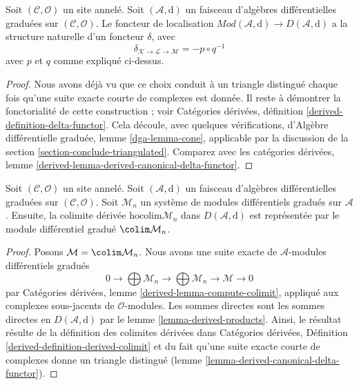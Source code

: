 \begin{lemma}
\label{lemma-derived-canonical-delta-functor}
Soit $(\mathcal{C}, \mathcal{O})$ un site annelé.
Soit $(\mathcal{A}, \text{d})$ un faisceau d'algèbres différentielles graduées sur $(\mathcal{C}, \mathcal{O})$.
Le foncteur de localisation $\textit{Mod}(\mathcal{A}, \text{d}) \to D(\mathcal{A}, \text{d})$ a la structure naturelle d'un foncteur $\delta$, avec
$$
\delta_{\mathcal{K} \to \mathcal{L} \to \mathcal{M}} = - p \circ q^{-1}
$$
avec $p$ et $q$ comme expliqué ci-dessus.
\end{lemma}

\begin{proof}
Nous avons déjà vu que ce choix conduit à un triangle distingué chaque fois qu'une suite exacte courte de complexes est donnée.
Il reste à démontrer la fonctorialité de cette construction ; voir Catégories dérivées, définition \ref{derived-definition-delta-functor}.
Cela découle, avec quelques vérifications, d'Algèbre différentielle graduée, lemme \ref{dga-lemma-cone}, applicable par la discussion de la section \ref{section-conclude-triangulated}.
Comparez avec les catégories dérivées, lemme \ref{derived-lemma-derived-canonical-delta-functor}.
\end{proof}

\begin{lemma}
\label{lemma-homotopy-colimit}
Soit $(\mathcal{C}, \mathcal{O})$ un site annelé.
Soit $(\mathcal{A}, \text{d})$ un faisceau d'algèbres différentielles graduées sur $(\mathcal{C}, \mathcal{O})$.
Soit $\mathcal{M}_n$ un système de modules différentiels gradués sur $\mathcal{A}$.
Ensuite, la colimite dérivée $\text{hocolim} \mathcal{M}_n$ dans $D(\mathcal{A}, \text{d})$ est représentée par le module différentiel gradué $\colim \mathcal{M}_n$.
\end{lemma}

\begin{proof}
Posons $\mathcal{M} = \colim \mathcal{M}_n$.
Nous avons une suite exacte de $\mathcal{A}$-modules différentiels gradués
$$
0 \to \bigoplus \mathcal{M}_n \to \bigoplus \mathcal{M}_n \to \mathcal{M} \to 0
$$
par Catégories dérivées, lemme \ref{derived-lemma-compute-colimit}, appliqué aux complexes sous-jacents de $\mathcal{O}$-modules.
Les sommes directes sont les sommes directes en $D(\mathcal{A}, \text{d})$ par le lemme \ref{lemma-derived-products}.
Ainsi, le résultat résulte de la définition des colimites dérivées dans Catégories dérivées, Définition \ref{derived-definition-derived-colimit}  et du fait qu'une suite exacte courte de complexes donne un triangle distingué (lemme \ref{lemma-derived-canonical-delta-functor}).
\end{proof}






